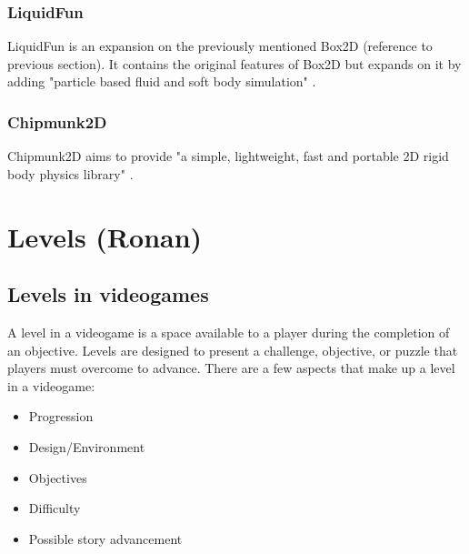 \documentclass{article} %
\begin{document}
\subsubsection{LiquidFun}

LiquidFun is an expansion on the previously mentioned Box2D (reference to previous section). It contains the original features of Box2D but expands on it by adding "particle based fluid and soft body simulation" \cite{Miles_2014}.

\subsubsection{Chipmunk2D}

Chipmunk2D aims to provide "a simple, lightweight, fast and portable 2D rigid body physics library" \cite{Slembcke_2023}.

\newpage

\section{Levels (Ronan)}
\subsection{Levels in videogames}
A level in a videogame is a space available to a player during 
the completion of an objective. Levels are designed to present a challenge, 
objective, or puzzle that players must overcome to advance. 
There are a few aspects that make up a level in a videogame:
\begin{itemize}
	\item Progression
	\item Design/Environment
	\item Objectives
	\item Difficulty
	\item Possible story advancement
\end{itemize}
\end{document}
